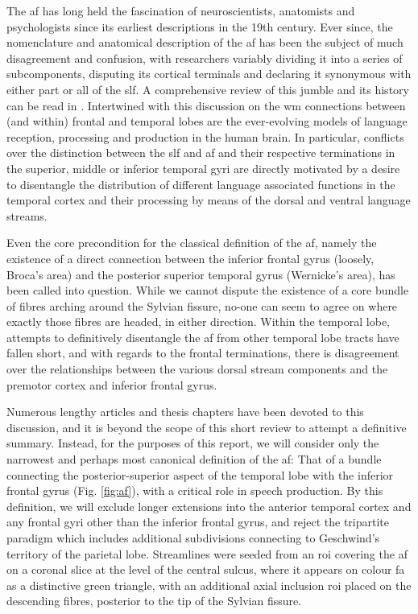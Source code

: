 The \gls{af} has long held the fascination of neuroscientists, anatomists and psychologists since its earliest descriptions in the 19th century\autocite{Burdach1822}.
Ever since, the nomenclature and anatomical description of the \gls{af} has been the subject of much disagreement and confusion, with researchers variably dividing it into a series of subcomponents, disputing its cortical terminals and declaring it synonymous with either part or all of the \gls{slf}.
A comprehensive review of this jumble and its history can be read in \textcite{PortodeOliveira2021}.
Intertwined with this discussion on the \gls{wm} connections between (and within) frontal and temporal lobes are the ever-evolving models of language reception, processing and production in the human brain\autocite{Becker2022a}.
In particular, conflicts over the distinction between the \gls{slf} and \gls{af} and their respective terminations in the superior, middle or inferior temporal gyri are directly motivated by a desire to disentangle the distribution of different language associated functions in the temporal cortex and their processing by means of the dorsal and ventral language streams\autocite{Hickok2004,Friederici2013a,Kljajevic2014a,Giampiccolo2022a,Becker2022a}.

Even the core precondition for the classical definition of the \gls{af}, namely the existence of a direct connection between the inferior frontal gyrus (loosely, Broca's area) and the posterior superior temporal gyrus (Wernicke's area), has been called into question\autocite{Dick2012,Giampiccolo2022a}.
While we cannot dispute the existence of a core bundle of fibres arching around the Sylvian fissure, no-one can seem to agree on where exactly those fibres are headed, in either direction.
Within the temporal lobe, attempts to definitively disentangle the \gls{af} from other temporal lobe tracts have fallen short\autocite{Becker2022}, and with regards to the frontal terminations, there is disagreement over the relationships between the various dorsal stream components and the premotor cortex and inferior frontal gyrus\autocite{Kljajevic2014a,Giampiccolo2022a}.

Numerous lengthy articles and thesis chapters have been devoted to this discussion, and it is beyond the scope of this short review to attempt a definitive summary.
Instead, for the purposes of this report, we will consider only the narrowest and perhaps most canonical definition of the \gls{af}:
That of a bundle connecting the posterior-superior aspect of the temporal lobe with the inferior frontal gyrus (Fig. \ref{fig:af}), with a critical role in speech production\autocite{Baldo2015}.
By this definition, we will exclude longer extensions into the anterior temporal cortex\autocite{Giampiccolo2022a} and any frontal gyri other than the inferior frontal gyrus, and reject the tripartite paradigm which includes additional subdivisions connecting to Geschwind's territory of the parietal lobe\autocite{Catani2005,Martino2013a}.
Streamlines were seeded from an \gls{roi} covering the \gls{af} on a coronal slice at the level of the central sulcus, where it appears on colour \gls{fa} as a distinctive green triangle, with an additional axial inclusion \gls{roi} placed on the descending fibres, posterior to the tip of the Sylvian fissure.


